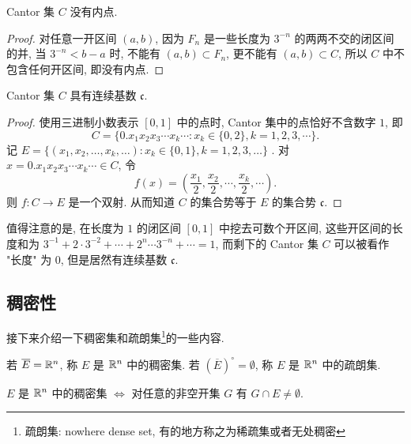 \begin{proposition} \label{prop:cantor-has-no-inter-point}
    Cantor 集 $C$ 没有内点.
\end{proposition}
\begin{proof}
    对任意一开区间 $(a, b)$, 因为 $F_n$ 是一些长度为 $3^{-n}$ 的两两不交的闭区间的并, 当 $3^{-n} < b-a$ 时, 不能有 $(a, b) \subset F_n$,
    更不能有 $(a, b)\subset C$, 所以 $C$ 中不包含任何开区间, 即没有内点.
\end{proof}

\begin{proposition}
    Cantor 集 $C$ 具有连续基数 $\mathfrak{c}$.
\end{proposition}
\begin{proof}
    使用三进制小数表示 $[0, 1]$ 中的点时, Cantor 集中的点恰好不含数字 $1$, 即
    \[
    C = \{0.x_1x_2x_3\cdots x_k\cdots : x_k \in \{0, 2\}, k=1, 2, 3, \cdots\}.
    \]
    记 $E = \{(x_1, x_2, \dots, x_k, \dots) : x_k \in \{0, 1\}, k=1, 2, 3, \dots\}$ . 对 $x=0.x_1x_2x_3\cdots x_k\cdots \in C$, 令\[
    f(x)=(\frac{x_1}{2}, \frac{x_2}{2}, \cdots, \frac{x_k}{2}, \cdots).
    \]
    则 $f: C \to E$ 是一个双射. 从而知道 $C$ 的集合势等于 $E$ 的集合势 $\mathfrak{c}$.
\end{proof}
\begin{remark}
    值得注意的是, 在长度为 $1$ 的闭区间 $[0, 1]$ 中挖去可数个开区间, 这些开区间的长度和为 $3^{-1}+2\cdot 3^{-2} + \cdots + 2^n \cdots 3^{-n} + \cdots = 1$, 而剩下的 Cantor 集 $C$
    可以被看作 "长度" 为 $0$, 但是居然有连续基数 $\mathfrak{c}$.
\end{remark}

\subsection{稠密性}

接下来介绍一下稠密集和疏朗集\footnote{疏朗集: nowhere dense set, 有的地方称之为稀疏集或者无处稠密}的一些内容.

\begin{definition}
    若 $\overline{E} = \mathbb{R}^n$, 称 $E$ 是 $\mathbb{R}^n$ 中的稠密集. 若 $\left(\overline{E}\right)^{\circ} = \emptyset$, 称 $E$ 是 $\mathbb{R}^n$ 中的疏朗集.
\end{definition}

\begin{lemma} \label{lem:dense-iff}
    $E$ 是 $\mathbb{R}^n$ 中的稠密集 $\iff$ 对任意的非空开集 $G$ 有 $G \cap E \ne \emptyset$.
\end{lemma}

